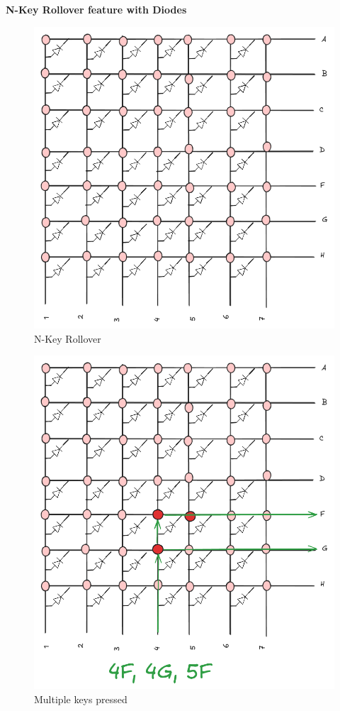 \documentclass[a4paper,11pt]{article}%
\begin{document}
\textbf{N-Key Rollover feature with Diodes}
\begin{figure}[H]
    \centering
    \includegraphics[scale=0.6]{figures/NKRO.png}
    \caption{N-Key Rollover}
\end{figure}

\begin{figure}[H]
	\centering
	\includegraphics[scale=0.6]{figures/NKRO-EX.png}
	\caption{Multiple keys pressed}
\end{figure}
\end{document}
